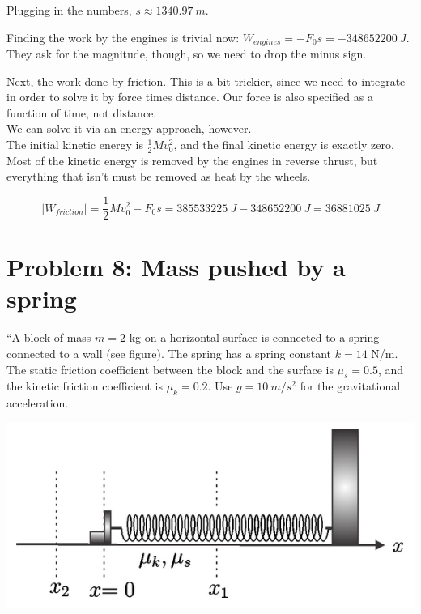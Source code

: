 \documentclass[8.01x]{subfiles}
\begin{document}
Plugging in the numbers, $s \approx \SI{1340.97}{m}$.

Finding the work by the engines is trivial now: $W_{engines} = -F_0 s = \SI{-348652200}{J}$. They ask for the magnitude, though, so we need to drop the minus sign.

Next, the work done by friction. This is a bit trickier, since we need to integrate in order to solve it by force times distance. Our force is also specified as a function of time, not distance.\\
We can solve it via an energy approach, however.\\
The initial kinetic energy is $\displaystyle \frac{1}{2} M v_0^2$, and the final kinetic energy is exactly zero. Most of the kinetic energy is removed by the engines in reverse thrust, but everything that isn't must be removed as heat by the wheels.

\begin{equation}
|W_{friction}| = \frac{1}{2} M v_0^2 - F_0 s = \SI{385533225}{J} - \SI{348652200}{J} = \SI{36881025}{J}
\end{equation}

\section{Problem 8: Mass pushed by a spring}

``A block of mass $m = 2$ kg on a horizontal surface is connected to a spring connected to a wall (see figure). The spring has a spring constant $k = 14$ N/m. The static friction coefficient between the block and the surface is $\mu_s = 0.5$, and the kinetic friction coefficient is $\mu_k = 0.2$. Use $g = \SI{10}{m/s^2}$ for the gravitational acceleration.

\begin{center}
\includegraphics[scale=0.5]{Graphics/midterm2p8}
\end{center}
\end{document}
